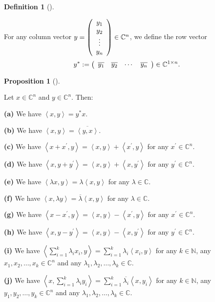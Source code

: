 \documentclass[numbers=enddot,12pt,final,onecolumn,notitlepage]{scrartcl}%
\numberwithin{exer}{subsection}
\theoremstyle{definition}
\newtheorem{prop}[theo]{Proposition}
\newenvironment{proposition}[1][]
{\begin{prop}[#1]\begin{leftbar}}
{\end{leftbar}\end{prop}}
\newtheorem{defi}[theo]{Definition}
\newenvironment{definition}[1][]
{\begin{defi}[#1]\begin{leftbar}}
{\end{leftbar}\end{defi}}
\let\sumnonlimits\sum
\renewcommand{\sum}{\sumnonlimits\limits}
\begin{document}
\begin{definition}
\label{def.unitary.innerprod.ystar}For any column vector $y=\left(
\begin{array}
[c]{c}%
y_{1}\\
y_{2}\\
\vdots\\
y_{n}%
\end{array}
\right)  \in\mathbb{C}^{n}$, we define the row vector
\[
y^{\ast}:=\left(
\begin{array}
[c]{cccc}%
\overline{y_{1}} & \overline{y_{2}} & \cdots & \overline{y_{n}}%
\end{array}
\right)  \in\mathbb{C}^{1\times n}.
\]

\end{definition}

\begin{proposition}
\label{prop.unitary.innerprod.props}Let $x\in\mathbb{C}^{n}$ and
$y\in\mathbb{C}^{n}$. Then: \medskip

\textbf{(a)} We have $\left\langle x,y\right\rangle =y^{\ast}x$. \medskip

\textbf{(b)} We have $\left\langle x,y\right\rangle =\overline{\left\langle
y,x\right\rangle }$. \medskip

\textbf{(c)} We have $\left\langle x+x^{\prime},y\right\rangle =\left\langle
x,y\right\rangle +\left\langle x^{\prime},y\right\rangle $ for any $x^{\prime
}\in\mathbb{C}^{n}$. \medskip

\textbf{(d)} We have $\left\langle x,y+y^{\prime}\right\rangle =\left\langle
x,y\right\rangle +\left\langle x,y^{\prime}\right\rangle $ for any $y^{\prime
}\in\mathbb{C}^{n}$. \medskip

\textbf{(e)} We have $\left\langle \lambda x,y\right\rangle =\lambda
\left\langle x,y\right\rangle $ for any $\lambda\in\mathbb{C}$. \medskip

\textbf{(f)} We have $\left\langle x,\lambda y\right\rangle =\overline
{\lambda}\left\langle x,y\right\rangle $ for any $\lambda\in\mathbb{C}$.
\medskip

\textbf{(g)} We have $\left\langle x-x^{\prime},y\right\rangle =\left\langle
x,y\right\rangle -\left\langle x^{\prime},y\right\rangle $ for any $x^{\prime
}\in\mathbb{C}^{n}$. \medskip

\textbf{(h)} We have $\left\langle x,y-y^{\prime}\right\rangle =\left\langle
x,y\right\rangle -\left\langle x,y^{\prime}\right\rangle $ for any $y^{\prime
}\in\mathbb{C}^{n}$. \medskip

\textbf{(i)} We have $\left\langle \sum_{i=1}^{k}\lambda_{i}x_{i}%
,y\right\rangle =\sum_{i=1}^{k}\lambda_{i}\left\langle x_{i},y\right\rangle $
for any $k\in\mathbb{N}$, any $x_{1},x_{2},\ldots,x_{k}\in\mathbb{C}^{n}$ and
any $\lambda_{1},\lambda_{2},\ldots,\lambda_{k}\in\mathbb{C}$. \medskip

\textbf{(j)} We have $\left\langle x,\sum_{i=1}^{k}\lambda_{i}y_{i}%
\right\rangle =\sum_{i=1}^{k}\overline{\lambda_{i}}\left\langle x,y_{i}%
\right\rangle $ for any $k\in\mathbb{N}$, any $y_{1},y_{2},\ldots,y_{k}%
\in\mathbb{C}^{n}$ and any $\lambda_{1},\lambda_{2},\ldots,\lambda_{k}%
\in\mathbb{C}$.
\end{proposition}
\end{document}
